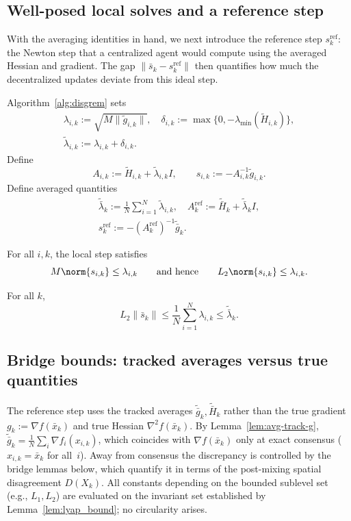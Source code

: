 \documentclass[review,onefignum,onetabnum]{siamart171218}
\begin{document}
\subsection{Well-posed local solves and a reference step}\label{ssec:refstep}
With the averaging identities in hand, we next introduce the
reference step $s_k^{\mathrm{ref}}$: the Newton step that a
centralized agent would compute using the averaged Hessian and gradient.
The gap $\|\bar s_k - s_k^{\mathrm{ref}}\|$ then quantifies how much the
decentralized updates deviate from this ideal step.

Algorithm~\ref{alg:disgrem} sets
\begin{gather*}
\lambda_{i,k}:=\sqrt{M\|\tilde g_{i,k}\|},\quad
\delta_{i,k}:=\max\{0,-\lambda_{\min}(\tilde H_{i,k})\},\\
\tilde\lambda_{i,k}:=\lambda_{i,k}+\delta_{i,k}.
\end{gather*}
Define
\[
A_{i,k}:=\tilde H_{i,k}+\tilde\lambda_{i,k}I,
\qquad
s_{i,k}:=-A_{i,k}^{-1}\tilde g_{i,k}.
\]
Define averaged quantities
\begin{gather*}
\tilde{\bar\lambda}_k:=\tfrac1N\textstyle\sum_{i=1}^N \tilde\lambda_{i,k},\quad
A_k^{\mathrm{ref}}:=\tilde{\bar H}_k+\tilde{\bar\lambda}_k I,\\
s_k^{\mathrm{ref}}:=-(A_k^{\mathrm{ref}})^{-1}\tilde{\bar g}_k.
\end{gather*}

\begin{lemma}\label{lem:M-vs-s}
For all $i,k$, the local step satisfies
\[
M\norm{s_{i,k}}\le \lambda_{i,k}
\qquad\text{and hence}\qquad
L_2\norm{s_{i,k}}\le \lambda_{i,k}.
\]
\end{lemma}

\begin{lemma}\label{lem:avg-regime}
For all $k$,
\[
L_2\|\bar s_k\|\le \frac1N\sum_{i=1}^N \lambda_{i,k}\le \tilde{\bar\lambda}_k.
\]
\end{lemma}

\subsection{Bridge bounds: tracked averages versus true quantities}\label{ssec:bridge}
The reference step uses the tracked averages
$\tilde{\bar g}_k,\tilde{\bar H}_k$ rather than the true gradient
$g_k:=\nabla f(\bar x_k)$ and true Hessian
$\nabla^2 f(\bar x_k)$.
By Lemma~\ref{lem:avg-track-g},
$\tilde{\bar g}_k = \frac{1}{N}\sum_{i}\nabla f_i(x_{i,k})$,
which coincides with $\nabla f(\bar x_k)$ only at exact
consensus ($x_{i,k}=\bar x_k$ for all~$i$).
Away from consensus the discrepancy is controlled by the
bridge lemmas below, which quantify it in terms of the
post-mixing spatial disagreement $D(X_k)$.
All constants depending on the bounded sublevel set
(e.g., $L_1,L_2$) are evaluated on the invariant set
established by Lemma~\ref{lem:lyap_bound}; no circularity arises.
\end{document}
